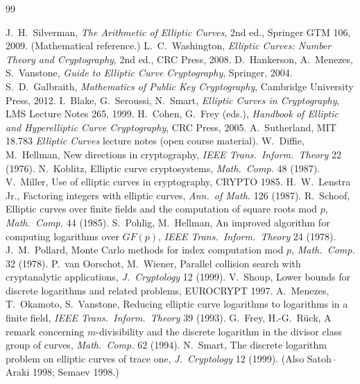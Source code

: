 \documentclass[11pt,a4paper,oneside]{book}
\theoremstyle{plain}
\theoremstyle{definition}
\theoremstyle{remark}
\begin{document}
\begin{thebibliography}{99}
\small
{} J.~H.~Silverman, \emph{The Arithmetic of Elliptic Curves}, 2nd ed., Springer GTM 106, 2009. (Mathematical reference.)
 L.~C.~Washington, \emph{Elliptic Curves: Number Theory and Cryptography}, 2nd ed., CRC Press, 2008.
 D.~Hankerson, A.~Menezes, S.~Vanstone, \emph{Guide to Elliptic Curve Cryptography}, Springer, 2004.
 S.~D.~Galbraith, \emph{Mathematics of Public Key Cryptography}, Cambridge University Press, 2012.
 I.~Blake, G.~Seroussi, N.~Smart, \emph{Elliptic Curves in Cryptography}, LMS Lecture Notes 265, 1999.
 H.~Cohen, G.~Frey (eds.), \emph{Handbook of Elliptic and Hyperelliptic Curve Cryptography}, CRC Press, 2005.
 A.~Sutherland, MIT 18.783 \emph{Elliptic Curves} lecture notes (open course material).
 W.~Diffie, M.~Hellman, New directions in cryptography, \emph{IEEE Trans.\ Inform.\ Theory} 22 (1976).
 N.~Koblitz, Elliptic curve cryptosystems, \emph{Math.\ Comp.} 48 (1987).
 V.~Miller, Use of elliptic curves in cryptography, CRYPTO 1985.
 H.~W.~Lenstra Jr., Factoring integers with elliptic curves, \emph{Ann.\ of Math.} 126 (1987).
 R.~Schoof, Elliptic curves over finite fields and the computation of square roots mod $p$, \emph{Math.\ Comp.} 44 (1985).
 S.~Pohlig, M.~Hellman, An improved algorithm for computing logarithms over $GF(p)$, \emph{IEEE Trans.\ Inform.\ Theory} 24 (1978).
 J.~M.~Pollard, Monte Carlo methods for index computation mod $p$, \emph{Math.\ Comp.} 32 (1978).
 P.~van Oorschot, M.~Wiener, Parallel collision search with cryptanalytic applications, \emph{J.\ Cryptology} 12 (1999).
 V.~Shoup, Lower bounds for discrete logarithms and related problems, EUROCRYPT 1997.
 A.~Menezes, T.~Okamoto, S.~Vanstone, Reducing elliptic curve logarithms to logarithms in a finite field, \emph{IEEE Trans.\ Inform.\ Theory} 39 (1993).
 G.~Frey, H.-G.~R\"uck, A remark concerning $m$-divisibility and the discrete logarithm in the divisor class group of curves, \emph{Math.\ Comp.} 62 (1994).
 N.~Smart, The discrete logarithm problem on elliptic curves of trace one, \emph{J.\ Cryptology} 12 (1999). (Also Satoh--Araki 1998; Semaev 1998.)

\end{thebibliography}
\end{document}
